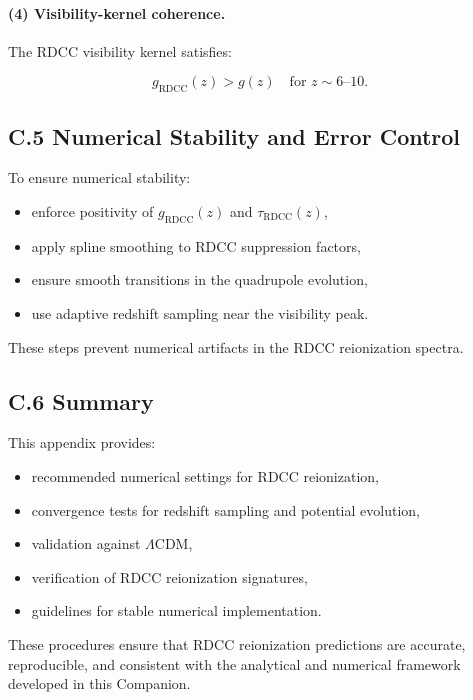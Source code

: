 \documentclass[11pt,a4paper]{article}
\begin{document}
\paragraph{(4) Visibility-kernel coherence.}
The RDCC visibility kernel satisfies:


\[
g_{\mathrm{RDCC}}(z) > g(z)
\quad \text{for } z \sim 6\text{–}10.
\]



\subsection*{C.5 Numerical Stability and Error Control}

To ensure numerical stability:

\begin{itemize}
\item enforce positivity of $g_{\mathrm{RDCC}}(z)$ and $\tau_{\mathrm{RDCC}}(z)$,
\item apply spline smoothing to RDCC suppression factors,
\item ensure smooth transitions in the quadrupole evolution,
\item use adaptive redshift sampling near the visibility peak.
\end{itemize}

These steps prevent numerical artifacts in the RDCC reionization spectra.

\subsection*{C.6 Summary}

This appendix provides:
\begin{itemize}
\item recommended numerical settings for RDCC reionization,
\item convergence tests for redshift sampling and potential evolution,
\item validation against $\Lambda$CDM,
\item verification of RDCC reionization signatures,
\item guidelines for stable numerical implementation.
\end{itemize}

These procedures ensure that RDCC reionization predictions are accurate, reproducible, and
consistent with the analytical and numerical framework developed in this Companion.
\end{document}
